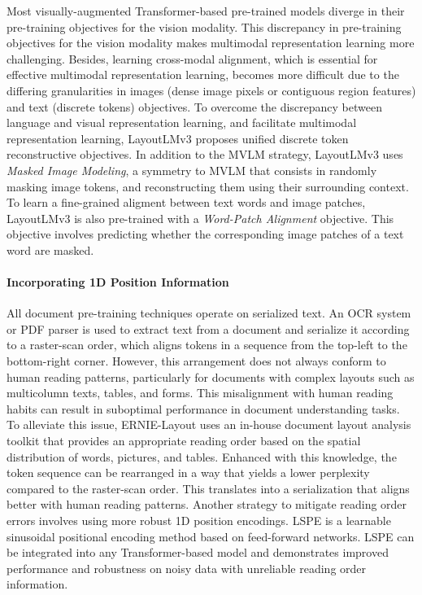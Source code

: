 Most visually-augmented Transformer-based pre-trained models diverge in their pre-training objectives for the vision modality. This discrepancy in pre-training objectives for the vision modality makes multimodal representation learning more challenging. Besides, learning cross-modal alignment, which is essential for effective multimodal representation learning, becomes more difficult due to the differing granularities in images (dense image pixels or contiguous region features) and text (discrete tokens) objectives. To overcome the discrepancy between language and visual representation learning, and facilitate multimodal representation learning, LayoutLMv3 \citep{huang2022layoutlmv3} proposes unified discrete token reconstructive objectives. In addition to the \ac{MVLM} strategy, LayoutLMv3 uses \textit{Masked Image Modeling}, a symmetry to \ac{MVLM} that consists in randomly masking image tokens, and reconstructing them using their surrounding context. To learn a fine-grained aligment between text words and image patches, LayoutLMv3 is also pre-trained with a \textit{Word-Patch Alignment} objective. This objective involves predicting whether the corresponding image patches of a text word are masked. 


\paragraph{Incorporating 1D Position Information}

All document pre-training techniques operate on serialized text. An \ac{OCR} system or PDF parser is used to extract text from a document and serialize it according to a raster-scan order, which aligns tokens in a sequence from the top-left to the bottom-right corner. However, this arrangement does not always conform to human reading patterns, particularly for documents with complex layouts such as multicolumn texts, tables, and forms. This misalignment with human reading habits can result in suboptimal performance in document understanding tasks. To alleviate this issue, ERNIE-Layout \citep{peng2022ernie} uses an in-house document layout analysis toolkit that provides an appropriate reading order based on the spatial distribution of words, pictures, and tables. Enhanced with this knowledge, the token sequence can be rearranged in a way that yields a lower perplexity compared to the raster-scan order. This translates into a serialization that aligns better with human reading patterns. Another strategy to mitigate reading order errors involves using more robust 1D position encodings. \ac{LSPE} \citep{wang2022simple} is a learnable sinusoidal positional encoding method based on feed-forward networks. \ac{LSPE} can be integrated into any Transformer-based model and demonstrates improved performance and robustness on noisy data with unreliable reading order information. 

